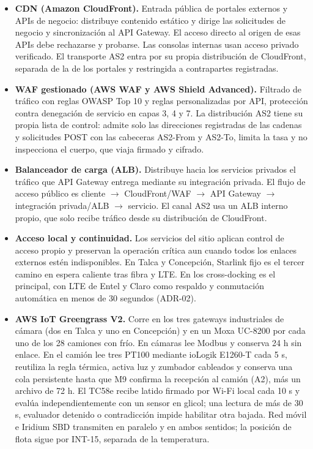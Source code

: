 \begin{itemize}
  \item \textbf{CDN (Amazon CloudFront).} Entrada pública de portales externos y APIs de negocio: distribuye contenido estático y dirige las solicitudes de negocio y sincronización al API Gateway. El acceso directo al origen de esas APIs debe rechazarse y probarse. Las consolas internas usan acceso privado verificado. El transporte AS2 entra por su propia distribución de CloudFront, separada de la de los portales y restringida a contrapartes registradas.
  \item \textbf{WAF gestionado (AWS WAF y AWS Shield Advanced).} Filtrado de tráfico con reglas OWASP Top 10 y reglas personalizadas por API, protección contra denegación de servicio en capas 3, 4 y 7. La distribución AS2 tiene su propia lista de control: admite solo las direcciones registradas de las cadenas y solicitudes POST con las cabeceras AS2-From y AS2-To, limita la tasa y no inspecciona el cuerpo, que viaja firmado y cifrado.
  \item \textbf{Balanceador de carga (ALB).} Distribuye hacia los servicios privados el tráfico que API Gateway entrega mediante su integración privada. El flujo de acceso público es cliente $\rightarrow$ CloudFront/WAF $\rightarrow$ API Gateway $\rightarrow$ integración privada/ALB $\rightarrow$ servicio. El canal AS2 usa un ALB interno propio, que solo recibe tráfico desde su distribución de CloudFront.
  \item \textbf{Acceso local y continuidad.} Los servicios del sitio aplican control de acceso propio y preservan la operación crítica aun cuando todos los enlaces externos estén indisponibles. En Talca y Concepción, Starlink fijo es el tercer camino en espera caliente tras fibra y LTE. En los cross-docking es el principal, con LTE de Entel y Claro como respaldo y conmutación automática en menos de 30 segundos (ADR-02).
  \item \textbf{AWS IoT Greengrass V2.} Corre en los tres gateways industriales de cámara (dos en Talca y uno en Concepción) y en un Moxa UC-8200 por cada uno de los 28 camiones con frío. En cámaras lee Modbus y conserva 24 h sin enlace. En el camión lee tres PT100 mediante ioLogik E1260-T cada 5 s, reutiliza la regla térmica, activa luz y zumbador cableados y conserva una cola persistente hasta que M9 confirma la recepción al camión (A2), más un archivo de 72 h. El TC58e recibe latido firmado por Wi-Fi local cada 10 s y evalúa independientemente con un sensor en glicol; una lectura de más de 30 s, evaluador detenido o contradicción impide habilitar otra bajada. Red móvil e Iridium SBD transmiten en paralelo y en ambos sentidos; la posición de flota sigue por INT-15, separada de la temperatura.
\end{itemize}

